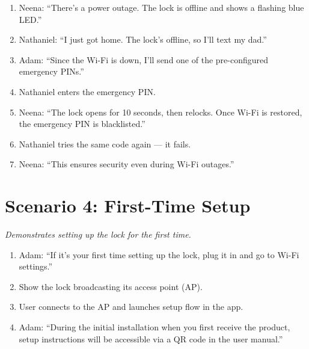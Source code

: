 \documentclass[12pt]{article}
\begin{document}
\begin{enumerate}
    \item Neena: “There’s a power outage. The lock is offline and shows a flashing blue LED.”
    \item Nathaniel: “I just got home. The lock’s offline, so I’ll text my dad.”
    \item Adam: “Since the Wi-Fi is down, I’ll send one of the pre-configured emergency PINs.”
    \item Nathaniel enters the emergency PIN.
    \item Neena: “The lock opens for 10 seconds, then relocks. Once Wi-Fi is restored, the emergency PIN is blacklisted.”
    \item Nathaniel tries the same code again — it fails.
    \item Neena: “This ensures security even during Wi-Fi outages.”
\end{enumerate}

\section{Scenario 4: First-Time Setup}
\textit{Demonstrates setting up the lock for the first time.}

\begin{enumerate}
    \item Adam: “If it’s your first time setting up the lock, plug it in and go to Wi-Fi settings.”
    \item Show the lock broadcasting its access point (AP).
    \item User connects to the AP and launches setup flow in the app.
    \item Adam: “During the initial installation when you first receive the product, setup instructions will be accessible via a QR code in the user manual.”
\end{enumerate}
\end{document}
